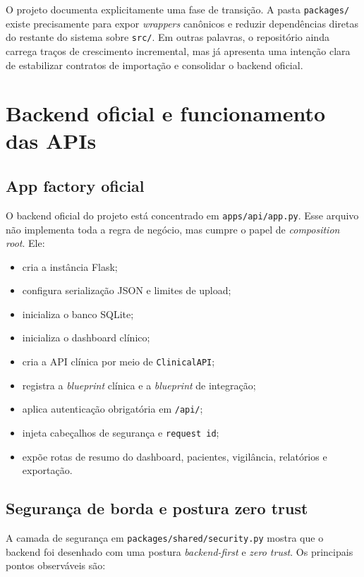 \documentclass[
    12pt,
    openright,
    oneside,
    a4paper,
    chapter=TITLE,
    section=TITLE,
    brazil,
    sumario=tradicional,
    hidelinks
]{abntex2}
\begin{document}
O projeto documenta explicitamente uma fase de transi\c{c}\~ao. A pasta \texttt{packages/} existe precisamente para expor \textit{wrappers} can\^onicos e reduzir depend\^encias diretas do restante do sistema sobre \texttt{src/}. Em outras palavras, o reposit\'orio ainda carrega tra\c{c}os de crescimento incremental, mas j\'a apresenta uma inten\c{c}\~ao clara de estabilizar contratos de importa\c{c}\~ao e consolidar o backend oficial.

\chapter{Backend oficial e funcionamento das APIs}

\section{App factory oficial}

O backend oficial do projeto est\'a concentrado em \texttt{apps/api/app.py}. Esse arquivo n\~ao implementa toda a regra de neg\'ocio, mas cumpre o papel de \textit{composition root}. Ele:

\begin{itemize}
    \item cria a inst\^ancia Flask;
    \item configura serializa\c{c}\~ao JSON e limites de upload;
    \item inicializa o banco SQLite;
    \item inicializa o dashboard cl\'inico;
    \item cria a API cl\'inica por meio de \texttt{ClinicalAPI};
    \item registra a \textit{blueprint} cl\'inica e a \textit{blueprint} de integra\c{c}\~ao;
    \item aplica autentica\c{c}\~ao obrigat\'oria em \texttt{/api/};
    \item injeta cabe\c{c}alhos de seguran\c{c}a e \texttt{request id};
    \item exp\~oe rotas de resumo do dashboard, pacientes, vigil\^ancia, relat\'orios e exporta\c{c}\~ao.
\end{itemize}

\section{Seguran\c{c}a de borda e postura zero trust}

A camada de seguran\c{c}a em \texttt{packages/shared/security.py} mostra que o backend foi desenhado com uma postura \textit{backend-first} e \textit{zero trust}. Os principais pontos observ\'aveis s\~ao:
\end{document}
